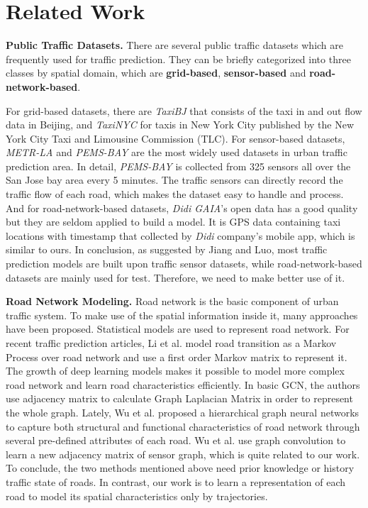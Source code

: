 
\section{Related Work}
\textbf{Public Traffic Datasets.} There are several public traffic datasets which are frequently used for traffic prediction. They can be briefly categorized into three classes by spatial domain, which are \textbf{grid-based}, \textbf{sensor-based} and \textbf{road-network-based}.

For grid-based datasets, there are \textit{TaxiBJ}\cite{taxibj} that consists of the taxi in and out flow data in Beijing, and \textit{TaxiNYC} for taxis in New York City published by the New York City Taxi and Limousine Commission (TLC). For sensor-based datasets, \textit{METR-LA}\cite{DCRNN} and \textit{PEMS-BAY} are the most widely used datasets in urban traffic prediction area. In detail, \textit{PEMS-BAY} is collected from 325 sensors all over the San Jose bay area every 5 minutes. The traffic sensors can directly record the traffic flow of each road, which makes the dataset easy to handle and process. And for road-network-based datasets, \textit{Didi GAIA}'s open data has a good quality but they are seldom applied to build a model. It is GPS data containing taxi locations with timestamp that collected by \textit{Didi} company's mobile app, which is similar to ours. In conclusion, as suggested by Jiang and Luo\cite{surveyGNN}, most traffic prediction models are built upon traffic sensor datasets, while road-network-based datasets are mainly used for test. Therefore, we need to make better use of it.

\vspace{\baselineskip}

\textbf{Road Network Modeling.} Road network is the basic component of urban traffic system. To make use of the spatial information inside it, many approaches have been proposed. Statistical models are used to represent road network. For recent traffic prediction articles, Li et al.\cite{AAAI21} model road transition as a Markov Process over road network and use a first order Markov matrix to represent it. The growth of deep learning models makes it possible to model more complex road network and learn road characteristics efficiently. In basic GCN\cite{GCN0}, the authors use adjacency matrix to calculate Graph Laplacian Matrix in order to represent the whole graph. Lately, Wu et al.\cite{roadrep} proposed a hierarchical graph neural networks to capture both structural and functional characteristics of road network through several pre-defined attributes of each road. Wu et al.\cite{GWNET} use graph convolution to learn a new adjacency matrix of sensor graph, which is quite related to our work. To conclude, the two methods mentioned above need prior knowledge or history traffic state of roads. In contrast, our work is to learn a representation of each road to model its spatial characteristics only by trajectories.

